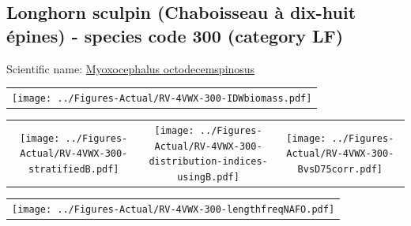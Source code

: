 \documentclass[12pt]{article}\usepackage[]{graphicx}\usepackage[]{color}
\begin{document}
\renewcommand\thefigure{\thesubsection\Alph{figure}}

\setcounter{figure}{0}

\hypertarget{sec:300}{%
\subsection{Longhorn sculpin (Chaboisseau à dix-huit épines) - species code 300 (category LF)}\label{sec:300}}

  


Scientific name: \href{http://www.marinespecies.org/aphia.php?p=taxdetails\&id=159520}{Myoxocephalus octodecemspinosus} \newline
\begin{minipage}{1.0\textwidth}
 \begin{tabular}{c}
\texttt{[image: ../Figures-Actual/RV-4VWX-300-IDWbiomass.pdf]} \\ 
\end{tabular} 
\end{minipage}
\newline

\vspace{1cm}
\begin{minipage}{1.0\textwidth}
 \begin{tabular}{ccc}
\texttt{[image: ../Figures-Actual/RV-4VWX-300-stratifiedB.pdf]} & 
\texttt{[image: ../Figures-Actual/RV-4VWX-300-distribution-indices-usingB.pdf]} & 
\texttt{[image: ../Figures-Actual/RV-4VWX-300-BvsD75corr.pdf]} \\ 
\end{tabular} 
\end{minipage}
\clearpage
\begin{minipage}{1.0\textwidth}
 \begin{tabular}{c}
\texttt{[image: ../Figures-Actual/RV-4VWX-300-lengthfreqNAFO.pdf]} \\ 
\end{tabular} 
\end{minipage}
\newline
\end{document}
